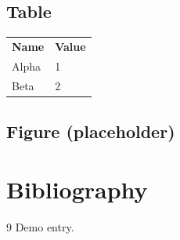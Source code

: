 \documentclass{article}
\begin{document}
\subsection{Table}
\begin{tabular}{ll}
  \textbf{Name} & \textbf{Value} \\
  Alpha & 1 \\
  Beta & 2 \\
\end{tabular}

\subsection{Figure (placeholder)}
\fbox{\rule{0pt}{2cm}\rule{2cm}{0pt}}

\section{Bibliography}
\begin{thebibliography}{9}
   Demo entry.
\end{thebibliography}
\end{document}

